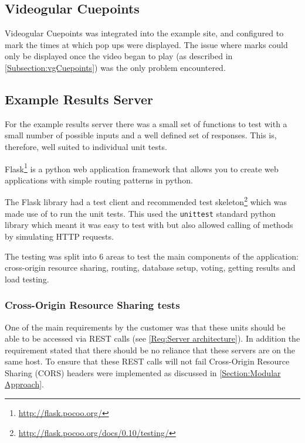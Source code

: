\subsection{Videogular Cuepoints}
\label{Subsection:Videogular Cuepoints in example}
\gls{Videogular} Cuepoints was integrated into the example site, and configured to mark the times at which pop ups were displayed. The issue where marks could only be displayed once the video began to play (as described in \autoref{Subsection:vgCuepoints}) was the only problem encountered.

\subsection{Example Results Server}
\label{Subsection:Example Results Server in example}

For the example results server there was a small set of functions to test with a small number of possible inputs and a well defined set of responses. This is, therefore, well suited to individual unit tests.

Flask\footnote{\url{http://flask.pocoo.org/}} is a python web application framework that allows you to create web applications with simple routing patterns in python.

The Flask library had a test client and recommended test skeleton\footnote{\url{http://flask.pocoo.org/docs/0.10/testing/}} which was made use of to run the unit tests. This used the \lstinline|unittest| standard python library which meant it was easy to test with but also allowed calling of methods by simulating HTTP requests.

The testing was split into 6 areas to test the main components of the application: cross-origin resource sharing, routing, database setup, voting, getting results and load testing.

\subsubsection{Cross-Origin Resource Sharing tests}

One of the main requirements by the customer was that these units should be able to be accessed via \gls{REST} calls (see \cref{Req:Server architecture}). In addition the requirement stated that there should be no reliance that these servers are on the same host. To ensure that these \gls{REST} calls will not fail Cross-Origin Resource Sharing (CORS) headers were implemented as discussed in \autoref{Section:Modular Approach}.

